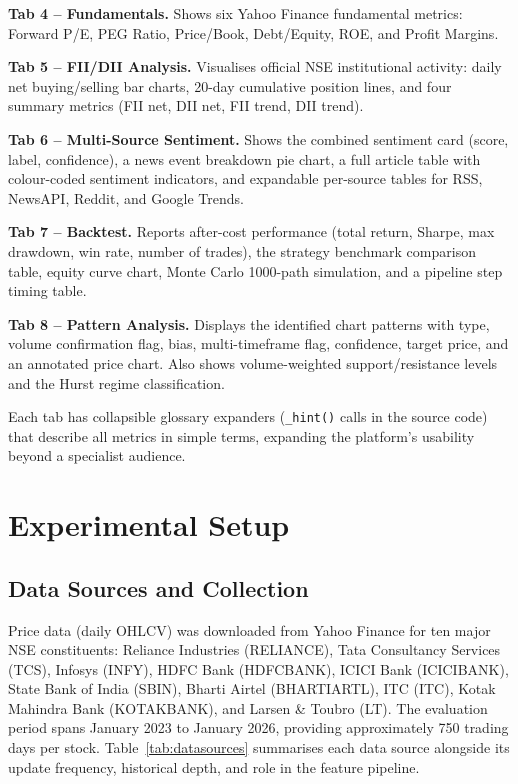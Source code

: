 \documentclass[10pt,a4paper,twoside]{article}
\begin{document}
\textbf{Tab 4 -- Fundamentals.} Shows six Yahoo Finance fundamental
metrics: Forward P/E, PEG Ratio, Price/Book, Debt/Equity, ROE, and
Profit Margins.

\textbf{Tab 5 -- FII/DII Analysis.} Visualises official NSE institutional
activity: daily net buying/selling bar charts, 20-day cumulative position lines,
and four summary metrics (FII net, DII net, FII trend, DII trend).

\textbf{Tab 6 -- Multi-Source Sentiment.} Shows the combined sentiment card
(score, label, confidence), a news event breakdown pie chart, a full
article table with colour-coded sentiment indicators, and expandable per-source
tables for RSS, NewsAPI, Reddit, and Google Trends.

\textbf{Tab 7 -- Backtest.} Reports after-cost performance (total return, Sharpe,
max drawdown, win rate, number of trades), the strategy benchmark comparison table,
equity curve chart, Monte Carlo 1000-path simulation, and a pipeline step timing
table.

\textbf{Tab 8 -- Pattern Analysis.} Displays the identified chart patterns with type,
volume confirmation flag, bias, multi-timeframe flag, confidence, target price,
and an annotated price chart. Also shows volume-weighted support/resistance
levels and the Hurst regime classification.

Each tab has collapsible glossary expanders (\texttt{\_hint()} calls in
the source code) that describe all metrics in simple terms, expanding the
platform's usability beyond a specialist audience.

\section{Experimental Setup}
\label{sec:setup}

\subsection{Data Sources and Collection}

Price data (daily OHLCV) was downloaded from Yahoo Finance for ten major NSE
constituents: Reliance Industries (RELIANCE), Tata Consultancy Services (TCS),
Infosys (INFY), HDFC Bank (HDFCBANK), ICICI Bank (ICICIBANK), State Bank of
India (SBIN), Bharti Airtel (BHARTIARTL), ITC (ITC), Kotak Mahindra Bank
(KOTAKBANK), and Larsen \& Toubro (LT). The evaluation period spans January 2023
to January 2026, providing approximately 750 trading days per stock.
Table~\ref{tab:datasources} summarises each data source alongside its update
frequency, historical depth, and role in the feature pipeline.
\end{document}

